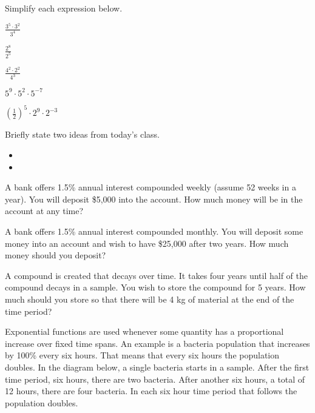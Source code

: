 \begin{problem}
  \vfill

  \clearpage

\item Simplify each expression below.
  \begin{subproblem}
  \item $\frac{3^5\cdot 3^2}{3^4}$
    \vfill
  \item $\frac{2^8}{2^5}$
    \vfill
  \item $\frac{4^2\cdot 2^2}{4^3}$
    \vfill
  \item $5^9\cdot 5^2\cdot 5^{-7}$
    \vfill
  \item $\left(\frac{1}{2}\right)^5 \cdot 2^9 \cdot 2^{-3}$
    \vfill
  \end{subproblem}

\end{problem}

\postClass

\begin{problem}
\item Briefly state two ideas from today's class.
  \begin{itemize}
  \item
  \item
  \end{itemize}
\item A bank offers 1.5\% annual interest compounded weekly (assume 52
  weeks in a year). You will deposit \$5,000 into the account. How
  much money will be in the account at any time?
\item A bank offers 1.5\% annual interest compounded monthly. You will
  deposit some money into an account and wish to have \$25,000 after
  two years. How much money should you deposit?
\item A compound is created that decays over time. It takes four years
  until half of the compound decays in a sample. You wish to store the
  compound for 5 years. How much should you store so that there will be
  4 kg of material at the end of the time period?
\end{problem}



Exponential functions are used whenever some quantity has a
proportional increase over fixed time spans. An example is a
bacteria population that increases by 100\% every six hours. That
means that every six hours the population doubles. In the diagram
below, a single bacteria starts in a sample. After the first time
period, six hours, there are two bacteria. After another six hours,
a total of 12 hours, there are four bacteria.
In each six hour time period that follows the population doubles.

